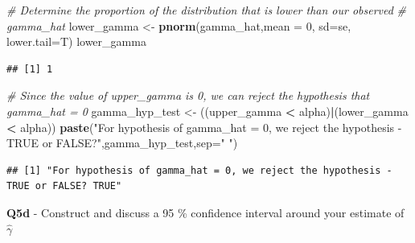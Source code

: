 \documentclass[
]{article}
\newenvironment{Shaded}{\begin{snugshade}}{\end{snugshade}}
\newcommand{\AttributeTok}[1]{\textcolor[rgb]{0.13,0.29,0.53}{#1}}
\newcommand{\CommentTok}[1]{\textcolor[rgb]{0.56,0.35,0.01}{\textit{#1}}}
\newcommand{\DecValTok}[1]{\textcolor[rgb]{0.00,0.00,0.81}{#1}}
\newcommand{\FunctionTok}[1]{\textcolor[rgb]{0.13,0.29,0.53}{\textbf{#1}}}
\newcommand{\NormalTok}[1]{#1}
\newcommand{\OtherTok}[1]{\textcolor[rgb]{0.56,0.35,0.01}{#1}}
\newcommand{\SpecialCharTok}[1]{\textcolor[rgb]{0.81,0.36,0.00}{\textbf{#1}}}
\newcommand{\StringTok}[1]{\textcolor[rgb]{0.31,0.60,0.02}{#1}}
\begin{document}
\begin{Shaded}
\begin{Highlighting}[]
\CommentTok{\# Determine the proportion of the distribution that is lower than our observed}
\CommentTok{\# gamma\_hat}
\NormalTok{lower\_gamma }\OtherTok{\textless{}{-}} \FunctionTok{pnorm}\NormalTok{(gamma\_hat,}\AttributeTok{mean =} \DecValTok{0}\NormalTok{, }\AttributeTok{sd=}\NormalTok{se, }\AttributeTok{lower.tail=}\NormalTok{T)}
\NormalTok{lower\_gamma}
\end{Highlighting}
\end{Shaded}

\begin{verbatim}
## [1] 1
\end{verbatim}

\begin{Shaded}
\begin{Highlighting}[]
\CommentTok{\# Since the value of upper\_gamma is 0, we can reject the hypothesis that gamma\_hat = 0}
\NormalTok{gamma\_hyp\_test }\OtherTok{\textless{}{-}}\NormalTok{ ((upper\_gamma }\SpecialCharTok{\textless{}}\NormalTok{ alpha)}\SpecialCharTok{|}\NormalTok{(lower\_gamma }\SpecialCharTok{\textless{}}\NormalTok{ alpha))}
\FunctionTok{paste}\NormalTok{(}\StringTok{"For hypothesis of gamma\_hat = 0, we reject the hypothesis {-} TRUE or FALSE?"}\NormalTok{,gamma\_hyp\_test,}\AttributeTok{sep=}\StringTok{" "}\NormalTok{)}
\end{Highlighting}
\end{Shaded}

\begin{verbatim}
## [1] "For hypothesis of gamma_hat = 0, we reject the hypothesis - TRUE or FALSE? TRUE"
\end{verbatim}

\hfill\break
\hfill\break

\textbf{Q5d} - Construct and discuss a 95 \% confidence interval around
your estimate of \(\hat{\gamma}\)\\
\end{document}
